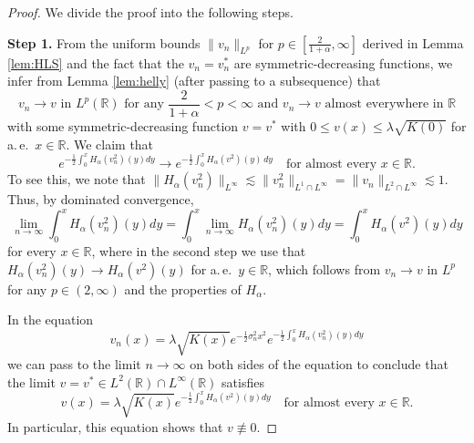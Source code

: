 \documentclass[10pt,a4paper]{amsart}
\newcommand{\R}{\mathbb{R}}
\newcommand{\be}{\begin{equation}}
\newcommand{\ee}{\end{equation}}
\renewcommand{\leq}{\leqslant}
\begin{document}
\begin{proof}
We divide the proof into the following steps.

\medskip
\textbf{Step 1.} From the uniform bounds $\| v_n \|_{L^p}$ for $p \in [\frac{2}{1+\alpha}, \infty]$ derived in Lemma \ref{lem:HLS} and the fact that the $v_n = v_n^*$ are symmetric-decreasing functions, we infer from Lemma \ref{lem:helly} (after passing to a subsequence) that
\be
\mbox{$v_n \to v$ in $L^p(\R)$ for any $\frac{2}{1+\alpha} < p < \infty$ and $v_n \to v$ almost everywhere in $\R$}
\ee
with some symmetric-decreasing function $v=v^*$ with $0 \leq v(x) \leq \lambda \sqrt{K(0)}$ for a.\,e.~$x \in \R$. We claim that
$$
e^{-\frac{1}{2} \int_0^x H_\alpha(v_n^2)(y) dy }\to e^{-\frac{1}{2} \int_0^x H_\alpha(v^2)(y) \,dy } \quad \mbox{for almost every $x \in \R$}.
$$ 
To see this, we note that $\| H_\alpha(v_n^2) \|_{L^\infty} \lesssim \| v_n^2 \|_{L^1 \cap L^\infty} = \| v_n \|_{L^2 \cap L^\infty} \lesssim 1$. Thus, by dominated convergence,
$$
\lim_{n \to \infty} \int_0^x H_\alpha(v_n^2)(y) dy = \int_0^x \lim_{n \to \infty} H_\alpha(v_n^2)(y) dy = \int_0^x H_\alpha(v^2)(y) dy
$$
for every $x \in \R$, where in the second step we use that $H_\alpha(v_n^2)(y)\to H_\alpha(v^2)(y)$ for a.\,e.~$y \in \R$, which follows from $v_n \to v$ in $L^p$ for any $p \in (2, \infty)$ and the properties of $H_\alpha$.

In the equation
\be \label{eq:vn}
v_n(x) = \lambda \sqrt{K(x)} e^{-\frac{1}{2} \sigma_n^2 x^2} e^{-\frac{1}{2} \int_0^x H_\alpha(v_n^2)(y) dy}
\ee
we can pass to the limit $n \to \infty$ on both sides of the equation to conclude that the limit $v=v^* \in L^2(\R) \cap L^\infty(\R)$ satisfies
\be \label{eq:limit}
v(x) = \lambda \sqrt{K(x)} e^{-\frac{1}{2} \int_0^x H_\alpha(v^2)(y) dy} \quad \mbox{for almost every $x \in \R$}.
\ee
In particular, this equation shows that $v \not \equiv 0$.
 

\end{proof}
\end{document}
